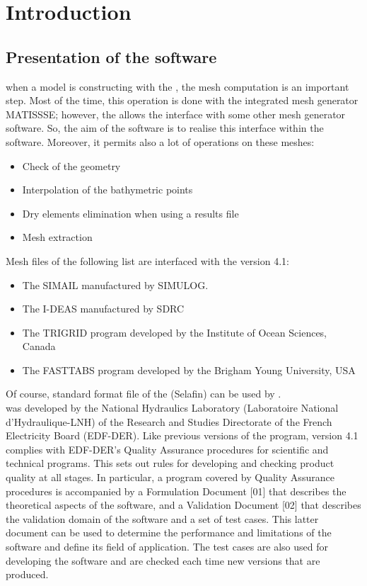 \chapter{Introduction}
\section{Presentation of the \stbtel software}
%
when a model is constructing with the \telemacsystem, the mesh computation is
an important step. Most of the time, this operation is done with the integrated
mesh generator MATISSSE; however, the \telemacsystem allows the interface with
some other mesh generator software. So, the aim of the \stbtel software is to
realise this interface within the \telemacsystem software. Moreover, it permits
also a lot of operations on these meshes:
\begin{itemize}
\item Check of the geometry
\item Interpolation of the bathymetric points
\item Dry elements elimination when using a  results file
\item Mesh extraction
\end{itemize}
Mesh files of the following list are interfaced with the \stbtel version 4.1:
\begin{itemize}
\item The SIMAIL manufactured by SIMULOG.
\item The I-DEAS manufactured by SDRC
\item The TRIGRID program developed by the Institute of Ocean Sciences, Canada
\item The FASTTABS program developed by the Brigham Young University, USA
\end{itemize}
Of course, standard format file of the \telemacsystem (Selafin) can be used by
\stbtel.\\
\stbtel was developed by the National Hydraulics Laboratory (Laboratoire
National d’Hydraulique-LNH) of the Research and Studies Directorate of the
French Electricity Board (EDF-DER). Like previous versions of the program,
version 4.1 complies with EDF-DER’s Quality Assurance procedures for scientific
and technical programs. This sets out rules for developing and checking product
quality at all stages. In particular, a program covered by Quality Assurance
procedures is accompanied by a Formulation Document [01] that describes the
theoretical aspects of the software, and a Validation Document [02] that
describes the validation domain of the software and a set of test cases. This
latter document can be used to determine the performance and limitations of the
software and define its field of application. The test cases are also used for
developing the software and are checked each time new versions that are
produced.

